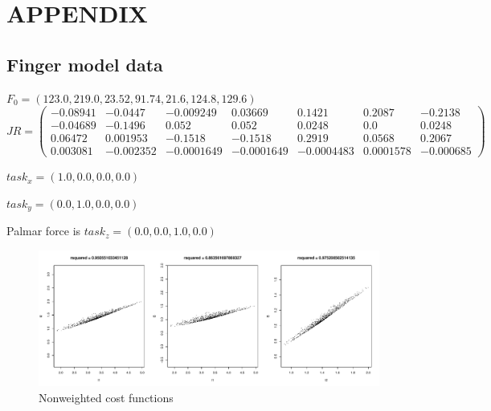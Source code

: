 \section{APPENDIX}

\subsection{Finger model data}
$F_0 = (123.0, 219.0, 23.52, 91.74,	21.6, 124.8, 129.6)$\\
$
JR = 
\begin{pmatrix}
-0.08941 & -0.0447 & -0.009249 & 0.03669 & 0.1421 & 0.2087 & -0.2138 \\
-0.04689 & -0.1496 & 0.052 &0.052 & 0.0248 & 0.0 & 0.0248 \\ 
0.06472 & 0.001953 & -0.1518 &-0.1518 & 0.2919 & 0.0568 & 0.2067 \\
0.003081 & -0.002352 & -0.0001649 & -0.0001649 & -0.0004483 & 0.0001578 & -0.000685
\end{pmatrix}$

$task_x = (1.0,0.0,0.0,0.0)$

$task_y = (0.0,1.0,0.0,0.0)$

Palmar force is $task_z = (0.0,0.0,1.0,0.0)$


\begin{figure}[h]
\centering
\includegraphics[width=\textwidth,page=1]{figs/cost_function_scatterplots.pdf}
\caption{Nonweighted cost functions}
\label{fig:unweighted_cost_functions}
\end{figure}

